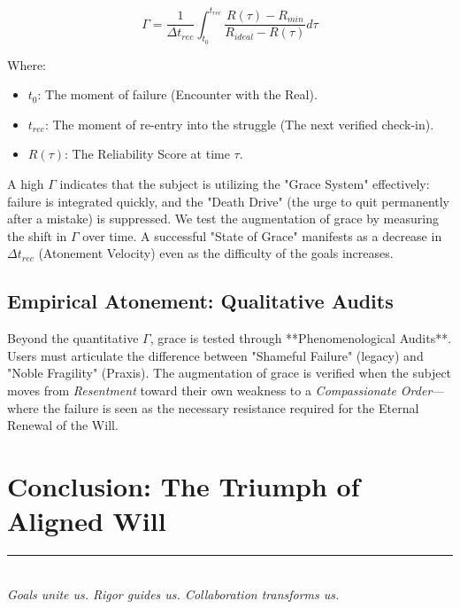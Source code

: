 \documentclass[12pt,a4paper,oneside]{report}
\begin{document}
\begin{equation}
\Gamma = \frac{1}{\Delta t_{rec}} \int_{t_0}^{t_{rec}} \frac{R(\tau) - R_{min}}{R_{ideal} - R(\tau)} d\tau
\end{equation}

Where:
\begin{itemize}
    \item $t_0$: The moment of failure (Encounter with the Real).
    \item $t_{rec}$: The moment of re-entry into the struggle (The next verified check-in).
    \item $R(\tau)$: The Reliability Score at time $\tau$.
\end{itemize}

A high $\Gamma$ indicates that the subject is utilizing the "Grace System" effectively: failure is integrated quickly, and the "Death Drive" (the urge to quit permanently after a mistake) is suppressed. We test the augmentation of grace by measuring the shift in $\Gamma$ over time. A successful "State of Grace" manifests as a decrease in $\Delta t_{rec}$ (Atonement Velocity) even as the difficulty of the goals increases.

\section{Empirical Atonement: Qualitative Audits}
Beyond the quantitative $\Gamma$, grace is tested through **Phenomenological Audits**. Users must articulate the difference between "Shameful Failure" (legacy) and "Noble Fragility" (Praxis). The augmentation of grace is verified when the subject moves from \textit{Resentment} toward their own weakness to a \textit{Compassionate Order}—where the failure is seen as the necessary resistance required for the Eternal Renewal of the Will.

\chapter{Conclusion: The Triumph of Aligned Will}

\vfill
\begin{center}
\textcolor{praxisBlue}{\rule{10cm}{1pt}} \\
\small\textcolor{praxisPurple}{\textit{Goals unite us. Rigor guides us. Collaboration transforms us.}}
\end{center}
\end{document}
